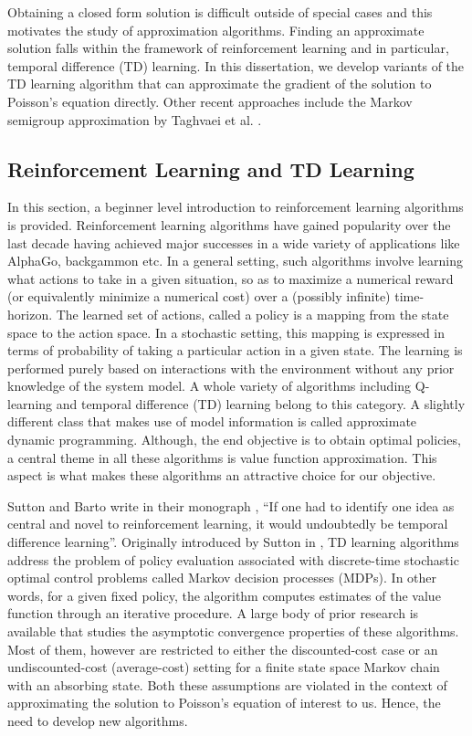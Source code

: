 Obtaining a closed form solution is difficult outside of special cases and this motivates the study of approximation algorithms. Finding an approximate solution falls within the framework of reinforcement learning and in particular, temporal difference (TD) learning. In this dissertation, we develop variants of the TD learning algorithm that can approximate the gradient of the solution to Poisson's equation directly. Other recent approaches include the Markov semigroup approximation by Taghvaei et al. \cite{tagmeh16a}.


\subsection{Reinforcement Learning and TD Learning}
\label{s:rl_td}
In this section, a beginner level introduction to reinforcement learning algorithms is provided. Reinforcement learning algorithms have gained popularity over the last decade having achieved major successes in a wide variety of applications like AlphaGo, backgammon etc.  In a general setting, such algorithms involve learning what actions to take in a given situation, so as to maximize a numerical reward (or equivalently minimize a numerical cost) over a (possibly infinite) time-horizon. The learned set of actions, called a policy is a mapping from the state space to the action space. In a stochastic setting, this mapping is expressed in terms of probability of taking a particular action in a given state. The learning is performed purely based on interactions with the environment without any prior knowledge of the system model. A whole variety of algorithms including Q-learning \cite{watday92a} and temporal difference (TD) learning \cite{sut88} belong to this category. A slightly different class that makes use of model information is called approximate dynamic programming. Although, the end objective is to obtain optimal policies, a central theme in all these algorithms is value function approximation. This aspect is what makes these algorithms an attractive choice for our objective. 

Sutton and Barto write in their monograph \cite{sutbar98}, ``If one had to identify one idea as central and novel to reinforcement learning, it would undoubtedly be temporal difference learning''. Originally introduced by Sutton in \cite{sut88}, TD learning algorithms address the problem of policy evaluation associated with discrete-time stochastic optimal control problems called Markov decision processes (MDPs). In other words, for a given fixed policy, the algorithm computes estimates of the value function through an iterative procedure. A large body of prior research is available that studies the asymptotic convergence properties of these algorithms. Most of them, however are restricted to either the discounted-cost case or an undiscounted-cost (average-cost) setting for a finite state space Markov chain with an absorbing state. Both these assumptions are violated in the context of approximating the solution to Poisson's equation of interest to us. Hence, the need to develop new algorithms. 

